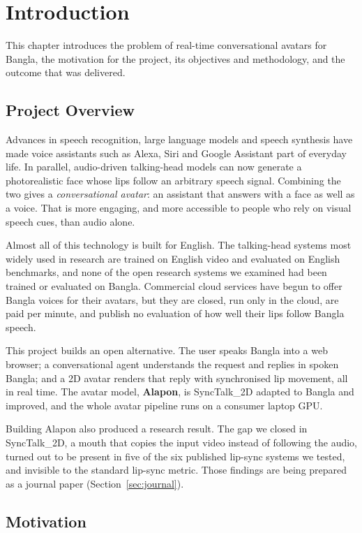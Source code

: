 \chapter{Introduction}

This chapter introduces the problem of real-time conversational avatars for Bangla, the motivation for the project, its objectives and methodology, and the outcome that was delivered.

\section{Project Overview}
Advances in speech recognition, large language models and speech synthesis have made voice assistants such as Alexa, Siri and Google Assistant part of everyday life. In parallel, audio-driven talking-head models can now generate a photorealistic face whose lips follow an arbitrary speech signal. Combining the two gives a \textit{conversational avatar}: an assistant that answers with a face as well as a voice. That is more engaging, and more accessible to people who rely on visual speech cues, than audio alone.

\noindent
Almost all of this technology is built for English. The talking-head systems most widely used in research are trained on English video and evaluated on English benchmarks, and none of the open research systems we examined had been trained or evaluated on Bangla. Commercial cloud services have begun to offer Bangla voices for their avatars, but they are closed, run only in the cloud, are paid per minute, and publish no evaluation of how well their lips follow Bangla speech.

\noindent
This project builds an open alternative. The user speaks Bangla into a web browser; a conversational agent understands the request and replies in spoken Bangla; and a 2D avatar renders that reply with synchronised lip movement, all in real time. The avatar model, \textbf{Alapon}, is SyncTalk\_2D \cite{synctalk2d} adapted to Bangla and improved, and the whole avatar pipeline runs on a consumer laptop GPU.

\noindent
Building Alapon also produced a research result. The gap we closed in SyncTalk\_2D, a mouth that copies the input video instead of following the audio, turned out to be present in five of the six published lip-sync systems we tested, and invisible to the standard lip-sync metric. Those findings are being prepared as a journal paper (Section~\ref{sec:journal}).

\section{Motivation}

